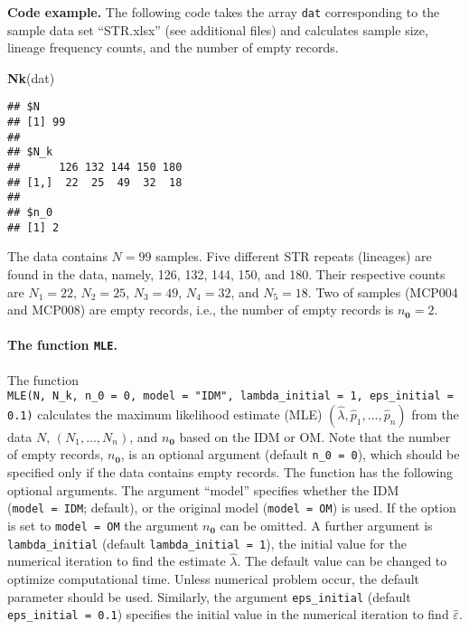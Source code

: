 \documentclass[
]{article}
\newenvironment{Shaded}{\begin{snugshade}}{\end{snugshade}}
\newcommand{\FunctionTok}[1]{\textcolor[rgb]{0.13,0.29,0.53}{\textbf{#1}}}
\newcommand{\NormalTok}[1]{#1}
\begin{document}
\textbf{Code example.} The following code takes the array \texttt{dat}
corresponding to the sample data set ``STR.xlsx'' (see additional files)
and calculates sample size, lineage frequency counts, and the number of
empty records.

\begin{Shaded}
\begin{Highlighting}[]
\FunctionTok{Nk}\NormalTok{(dat)}
\end{Highlighting}
\end{Shaded}

\begin{verbatim}
## $N
## [1] 99
## 
## $N_k
##      126 132 144 150 180
## [1,]  22  25  49  32  18
## 
## $n_0
## [1] 2
\end{verbatim}

The data contains \(N=99\) samples. Five different STR repeats
(lineages) are found in the data, namely, 126, 132, 144, 150, and 180.
Their respective counts are \(N_1=22\), \(N_2=25\), \(N_3=49\),
\(N_4=32\), and \(N_5=18\). Two of samples (MCP004 and MCP008) are empty
records, i.e., the number of empty records is \(n_{\pmb 0} = 2\).

\hypertarget{the-function-mle.}{%
\paragraph{\texorpdfstring{The function
\texttt{MLE}.}{The function MLE.}}\label{the-function-mle.}}

The function
\texttt{MLE(N,\ N\_k,\ n\_0\ =\ 0,\ model\ =\ "IDM",\ lambda\_initial\ =\ 1,\ eps\_initial\ =\ 0.1)}
calculates the maximum likelihood estimate (MLE)
\((\hat \lambda, \hat p_1,\ldots, \hat p_n)\) from the data \(N\),
\((N_1,\ldots, N_n)\), and \(n_{\pmb 0}\) based on the IDM or OM. Note
that the number of empty records, \(n_{\pmb 0}\), is an optional
argument (default \texttt{n\_0\ =\ 0}), which should be specified only
if the data contains empty records. The function has the following
optional arguments. The argument ``model'' specifies whether the IDM
(\texttt{model\ =\ \textquotesingle{}IDM\textquotesingle{}}; default),
or the original model
(\texttt{model\ =\ \textquotesingle{}OM\textquotesingle{}}) is used. If
the option is set to
\texttt{model\ =\ \textquotesingle{}OM\textquotesingle{}} the argument
\(n_{\pmb 0}\) can be omitted. A further argument is
\texttt{lambda\_initial} (default \texttt{lambda\_initial\ =\ 1}), the
initial value for the numerical iteration to find the estimate
\(\hat \lambda\). The default value can be changed to optimize
computational time. Unless numerical problem occur, the default
parameter should be used. Similarly, the argument \texttt{eps\_initial}
(default \texttt{eps\_initial\ =\ 0.1}) specifies the initial value in
the numerical iteration to find \(\hat\varepsilon\).
\end{document}

